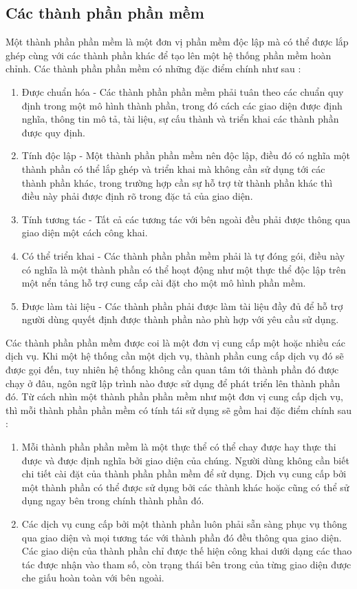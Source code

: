 \subsection{Các thành phần phần mềm}
Một thành phần phần mềm là một đơn vị phần mềm độc lập mà có thể được lắp ghép cùng với các thành phần khác để tạo lên một hệ thống phần mềm hoàn chỉnh. Các thành phần phần mềm có những đặc điểm chính như sau : 
\begin{enumerate}
  \item Được chuẩn hóa - Các thành phần phần mềm phải tuân theo các chuẩn quy định trong một mô hình thành phần, trong đó cách các giao diện được định nghĩa, thông tin mô tả, tài liệu, sự cấu thành và triển khai các thành phần được quy định.
	\item Tính độc lập - Một thành phần phần mềm nên độc lập, điều đó có nghĩa một thành phần có thể lắp ghép và triển khai mà không cần sử dụng tới các thành phần khác, trong trường hợp cần sự hỗ trợ từ thành phần khác thì điều này phải được định rõ trong đặc tả của giao diện.
	\item Tính tương tác - Tất cả các tương tác với bên ngoài đều phải được thông qua giao diện một cách công khai.
	\item Có thể triển khai - Các thành phần phần mềm phải là tự đóng gói, điều này có nghĩa là một thành phần có thể hoạt động như một thực thể độc lập trên một nển tảng hỗ trợ cung cấp cài đặt cho một mô hình phần mềm.
	\item Được làm tài liệu - Các thành phần phải được làm tài liệu đầy đủ để hỗ trợ người dùng quyết định được thành phần nào phù hợp với yêu cầu sử dụng.\\
\end{enumerate}

Các thành phần phần mềm được coi là một đơn vị cung cấp một hoặc nhiều các dịch vụ. Khi một hệ thống cần một dịch vụ, thành phần cung cấp dịch vụ đó sẽ được gọi đến, tuy nhiên hệ thống không cần quan tâm tới thành phần đó được chạy ở đâu, ngôn ngữ lập trình nào được sử dụng để phát triển lên thành phần đó.
Từ cách nhìn một thành phần phần mềm như một đơn vị cung cấp dịch vụ, thì mỗi thành phần phần mềm có tính tái sử dụng sẽ gồm hai đặc điểm chính sau :

\begin{enumerate}
  \item Mỗi thành phần phần mềm là một thực thể có thể chay được hay thực thi được và được định nghĩa bởi giao diện của chúng. Người dùng không cần biết chi tiết cài đặt của thành phần phần mềm để sử dụng. Dịch vụ cung cấp bởi một thành phần có thể được sử dụng bởi các thành khác hoặc cũng có thể sử dụng ngay bên trong chính thành phần đó.
	\item Các dịch vụ cung cấp bởi một thành phần luôn phải sẵn sàng phục vụ thông qua giao diện và mọi tương tác với thành phần đó đều thông qua giao diện. Các giao diện của thành phần chỉ được thế hiện công khai dưới dạng các thao tác được nhận vào tham số, còn trạng thái bên trong của từng giao diện được che giấu hoàn toàn với bên ngoài.\\
\end{enumerate}

